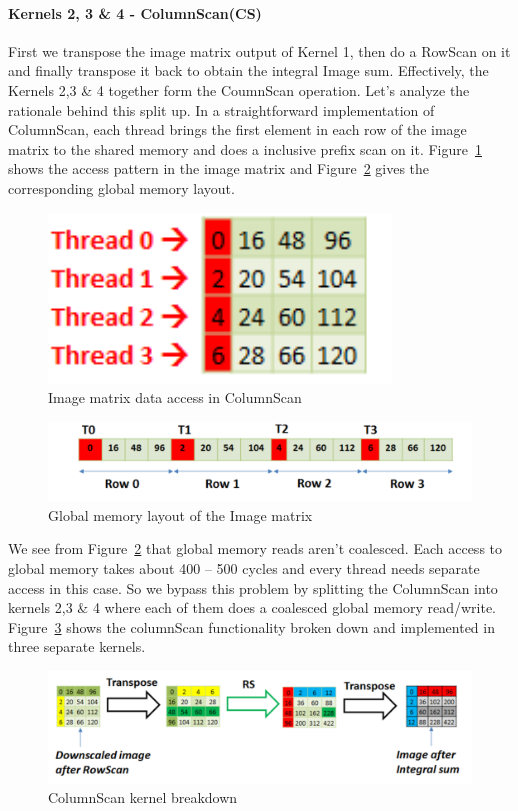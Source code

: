 \paragraph{Kernels 2, 3 \& 4 - ColumnScan(CS)}
First we transpose the image matrix output of Kernel 1, then do a 
RowScan on it and finally transpose it back to obtain the integral Image sum. 
Effectively, the Kernels 2,3 \& 4 together form the CoumnScan operation. 
Let’s analyze the rationale behind this split up. In a straightforward 
implementation of ColumnScan, each thread brings the first element in each row of 
the image matrix to the shared memory and does a inclusive prefix scan on it. 
Figure~\ref{fig:cs_impl} shows the access pattern in the image matrix and 
Figure~\ref{fig:gm_layout} gives the corresponding global memory layout.

\begin{figure}[h]
  \centering
  \includegraphics[width=0.4\linewidth]{figs/img_matrix_crop.pdf}
  \caption{Image matrix data access in ColumnScan }
  \label{fig:cs_impl}
\end{figure}

\begin{figure}[h]
  \centering
  \includegraphics[width=\linewidth]{figs/global_mem_crop.pdf}
  \vspace{0.05in}
  \caption{Global memory layout of the Image matrix }
  \label{fig:gm_layout}
\end{figure}

We see from Figure~\ref{fig:gm_layout} that global memory reads aren’t coalesced. Each access to 
global memory takes about 400 – 500 cycles and every thread needs separate 
access in this case. So we bypass this problem by splitting the ColumnScan 
into kernels 2,3 \& 4 where each of them does a coalesced global memory read/write. 
Figure~\ref{fig:cs_brkdwn } shows the columnScan functionality broken down and implemented in three separate kernels. 

\begin{figure}[h]
  \centering
  \includegraphics[width=0.85\linewidth]{figs/cs_break_crop.pdf}
  \caption{ColumnScan kernel breakdown }
  \label{fig:cs_brkdwn }
\end{figure}


